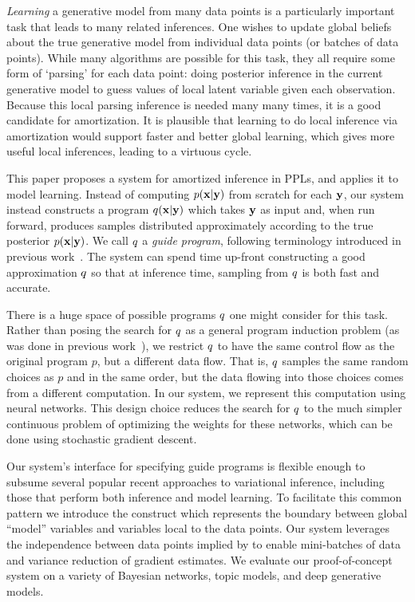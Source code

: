 \emph{Learning} a generative model from many data points is a particularly important task that leads to many related inferences.
One wishes to update global beliefs about the true generative model from individual data points (or batches of data points).
While many algorithms are possible for this task, they all require some form of  `parsing' for each data point: doing posterior inference in the current generative model to guess values of local latent variable given each observation.
Because this local parsing inference is needed many many times, it is a good candidate for amortization.
It is plausible that learning to do local inference via amortization would support faster and better global learning, which gives more useful local inferences, leading to a virtuous cycle.


This paper proposes a system for amortized inference in PPLs, and applies it to model learning. Instead of computing $p(\mathbf{x} | \mathbf{y})$ from scratch for each $\mathbf{y}$, our system instead constructs a program $q(\mathbf{x} | \mathbf{y})$ which takes $\mathbf{y}$ as input and, when run forward, produces samples distributed approximately according to the true posterior $p(\mathbf{x} | \mathbf{y})$.
We call $q$ a \emph{guide program}, following terminology introduced in previous work~\cite{GuidePrograms}.
The system can spend time up-front constructing a good approximation $q$ so that at inference time, sampling from $q$ is both fast and accurate.

There is a huge space of possible programs $q$ one might consider for this task. Rather than posing the search for $q$ as a general program induction problem (as was done in previous work~\cite{GuidePrograms}), we restrict $q$ to have the same control flow as the original program $p$, but a different data flow.
That is, $q$ samples the same random choices as $p$ and in the same order, but the data flowing into those choices comes from a different computation.
In our system, we represent this computation using neural networks.
This design choice reduces the search for $q$ to the much simpler continuous problem of optimizing the weights for these networks, which can be done using stochastic gradient descent.

Our system's interface for specifying guide programs is flexible enough to subsume several popular recent approaches to variational inference, including those that perform both inference and model learning. To facilitate this common pattern we introduce the  construct which represents the boundary between global ``model'' variables and variables local to the data points. Our system leverages the independence between data points implied by  to enable mini-batches of data and variance reduction of gradient estimates.
We evaluate our proof-of-concept system on a variety of Bayesian networks, topic models, and deep generative models.

